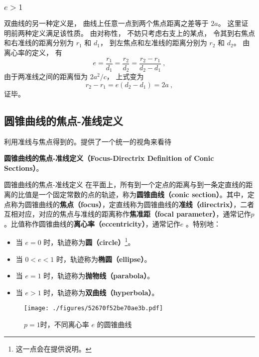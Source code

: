 \subsubsection{$e>1$}
双曲线的另一种定义是， 曲线上任意一点到两个焦点距离之差等于 $2a$。 这里证明前两种定义满足该性质。 由对称性， 不妨只考虑右支上的某点， 令其到右焦点和右准线的距离分别为 $r_1$ 和 $d_1$， 到左焦点和左准线的距离分别为 $r_2$ 和 $d_2$。 由离心率的定义， 有
\begin{equation}
e = \frac{r_1}{d_1} = \frac{r_2}{d_2} = \frac{r_2 - r_1}{d_2 - d_1}~,
\end{equation}
由于两准线之间的距离恒为 $2a^2/c$， 上式变为
\begin{equation}
r_2 - r_1 = e(d_2 - d_1) = 2a~,
\end{equation}
证毕。

\subsection{圆锥曲线的焦点-准线定义}



利用准线与焦点得到的。提供了一个统一的视角来看待



\textbf{圆锥曲线的焦点-准线定义（Focus-Directrix Definition of Conic Sections）}。

\begin{definition}{圆锥曲线的焦点-准线定义}\label{def_HsCsFD_1}
在平面上，所有到一个定点的距离与到一条定直线的距离的比值是一个固定常数的点的轨迹，称为\textbf{圆锥曲线（conic section）}。其中，定点称为圆锥曲线的\textbf{焦点（focus）}，定直线称为圆锥曲线的\textbf{准线（directrix）}，二者互相对应，对应的焦点与准线的距离称作\textbf{焦准距（focal parameter）}，通常记作$p$。比值称作圆锥曲线的\textbf{离心率（eccentricity）}，通常记作$e$ 。特别地：
\begin{itemize}
\item 当 $e = 0$ 时，轨迹称为\textbf{圆（circle）}\footnote{这一点会在提供说明。}。
\item 当 $0 < e < 1$ 时，轨迹称为\textbf{椭圆（ellipse）}。
\item 当 $e = 1$ 时，轨迹称为\textbf{抛物线（parabola）}。
\item 当 $e > 1$ 时，轨迹称为\textbf{双曲线（hyperbola）}。
\end{itemize}
\end{definition}

\begin{figure}[ht]
\centering
\texttt{[image: ./figures/52670f52be70ae3b.pdf]}
\caption{$p = 1$时，不同离心率 $e$ 的圆锥曲线} \label{fig_Cone_2}
\end{figure}


